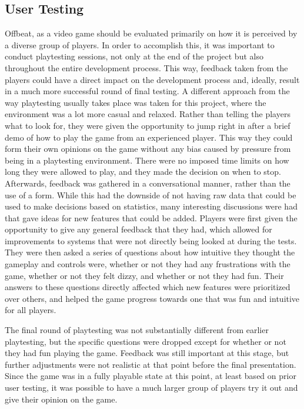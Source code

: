 \documentclass[10pt,twocolumn]{article}
\begin{document}
\subsection{User Testing}
Offbeat, as a video game should be evaluated primarily on how it is perceived by a diverse group of players. In order to accomplish this, it was important to conduct playtesting sessions, not only at the end of the project but also throughout the entire development process. This way, feedback taken from the players could have a direct impact on the development process and, ideally, result in a much more successful round of final testing. A different approach from the way playtesting usually takes place was taken for this project, where the environment was a lot more casual and relaxed. Rather than telling the players what to look for, they were given the opportunity to jump right in after a brief demo of how to play the game from an experienced player. This way they could form their own opinions on the game without any bias caused by pressure from being in a playtesting environment. There were no imposed time limits on how long they were allowed to play, and they made the decision on when to stop. Afterwards, feedback was gathered in a conversational manner, rather than the use of a form. While this had the downside of not having raw data that could be used to make decisions based on statistics, many interesting discussions were had that gave ideas for new features that could be added. Players were first given the opportunity to give any general feedback that they had, which allowed for improvements to systems that were not directly being looked at during the tests. They were then asked a series of questions about how intuitive they thought the gameplay and controls were, whether or not they had any frustrations with the game, whether or not they felt dizzy, and whether or not they had fun. Their answers to these questions directly affected which new features were prioritized over others, and helped the game progress towards one that was fun and intuitive for all players.

The final round of playtesting was not substantially different from earlier playtesting, but the specific questions were dropped except for whether or not they had fun playing the game. Feedback was still important at this stage, but further adjustments were not realistic at that point before the final presentation. Since the game was in a fully playable state at this point, at least based on prior user testing, it was possible to have a much larger group of players try it out and give their opinion on the game.
\end{document}
